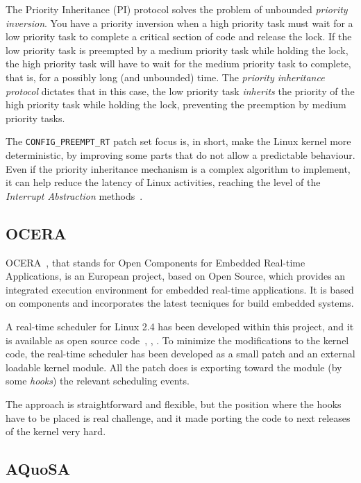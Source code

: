 The Priority Inheritance (PI) protocol solves the problem of unbounded
\emph{priority inversion}. You have a priority inversion when a high
priority task must wait for a low priority task to complete a critical
section of code and release the lock. If the low priority task is
preempted by a medium priority task while holding the lock, the high
priority task will have to wait for the medium priority task to
complete, that is, for a possibly long (and unbounded) time.  The
\emph{priority inheritance protocol} dictates that in this case, the
low priority task \emph{inherits} the priority of the high priority
task while holding the lock, preventing the preemption by medium
priority tasks.

The \texttt{CONFIG\_PREEMPT\_RT} patch set focus is, in short, make
the Linux kernel more deterministic, by improving some parts that do
not allow a predictable behaviour. Even if the priority inheritance
mechanism is a complex algorithm to implement, it can help reduce the
latency of Linux activities, reaching the level of the \emph{Interrupt
  Abstraction} methods~\cite{LipariScordino2006}.

\subsection{OCERA\label{sec:StateArt_OCERA}}

OCERA~\cite{OCERA}, that stands for Open Components for Embedded Real-time
Applications, is an European project, based on Open Source, which provides
an integrated execution environment for embedded real-time applications. It is
based on components and incorporates the latest tecniques for build embedded
systems.

A real-time scheduler for Linux 2.4 has been developed within this
project, and it is available as open source code~\cite{abeni06},
\cite{RTOS_analysis02}, \cite{ScordinoRR}. To minimize the
modifications to the kernel code, the real-time scheduler has been
developed as a small patch and an external loadable kernel module. All
the patch does is exporting toward the module (by some \emph{hooks})
the relevant scheduling events.

The approach is straightforward and flexible, but the position where
the hooks have to be placed is real challenge, and it made porting the
code to next releases of the kernel very hard.

\subsection{AQuoSA\label{sec:StateArt_AQuoSA}}

